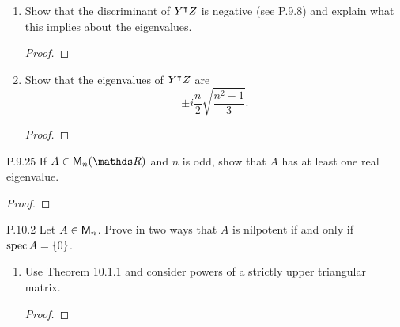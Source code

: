 \documentclass{../homework}
\begin{document}
\begin{problems}
\begin{enumerate}
    \begin{solution}
      \begin{proof}

      \end{proof}
    \end{solution}

  \item Show that the discriminant of \(Y^\intercal Z\) is negative
    (see P.9.8) and explain what this implies about the eigenvalues.

    \begin{solution}
      \begin{proof}

      \end{proof}
    \end{solution}

  \item Show that the eigenvalues of \(Y^\intercal Z\) are
    \[
      \pm i \frac n 2 \sqrt{\frac{n^2-1}{3}}.
    \]

    \begin{solution}
      \begin{proof}

      \end{proof}
    \end{solution}
  \end{enumerate}

\item[P.9.25] If \(A \in \M_n(\RR)\) and \(n\) is odd, show that \(A\)
  has at least one real eigenvalue.

  \begin{solution}
    \begin{proof}

    \end{proof}
  \end{solution}

\item[P.10.2] Let \(A \in \mathsf{M}_n\).  Prove in two ways that \(A\) is
  nilpotent if and only if \(\operatorname{spec} A = \{ {0} \}\).
  \begin{enumerate}
  \item Use Theorem 10.1.1 and consider powers of a strictly upper
    triangular matrix.

    \begin{solution}
      \begin{proof}

      \end{proof}
    \end{solution}


\end{enumerate}
\end{problems}
\end{document}
